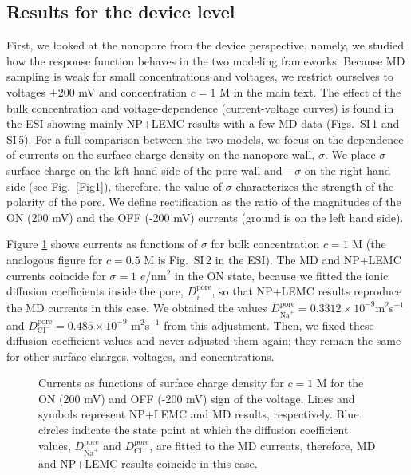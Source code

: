 \documentclass[fleqn,10pt]{SelfArx} %
\begin{document}
\subsection*{Results for the device level}

First, we looked at the nanopore from the device perspective, namely, we studied how the response function behaves in the two modeling frameworks.
Because MD sampling is weak for small concentrations and voltages, we restrict ourselves to voltages $\pm 200$ mV and concentration $c=1$ M in the main text.
The effect of the bulk concentration and voltage-dependence (current-voltage curves) is found in the ESI showing mainly NP+LEMC results with a few MD data (Figs.\ SI\,1 and SI\,5).
For a full comparison between the two models, we focus on the dependence of currents on the surface charge density on the nanopore wall, $\sigma$.
We place $\sigma$ surface charge on the left hand side of the pore wall and $-\sigma$ on the right hand side (see Fig.\ \ref{Fig1}), therefore, the value of $\sigma$ characterizes the strength of the polarity of the pore. 
We define rectification as the ratio of the magnitudes of the  ON (200 mV) and the OFF (-200 mV) currents (ground is on the left hand side).

Figure \ref{Fig2} shows currents as functions of $\sigma$ for bulk concentration $c=1$ M (the analogous figure for $c=0.5$ M is Fig.\ SI\,2 in the ESI).
The MD and NP+LEMC currents coincide for $\sigma=1$ $e$/nm$^{2}$ in the ON state, because we fitted the ionic diffusion coefficients inside the pore, $D_{i}^{\mathrm{pore}}$, so that NP+LEMC results reproduce the MD currents in this case.
We obtained the values $D_{\mathrm{Na}^{+}}^{\mathrm{pore}}=0.3312\times 10^{-9}$m$^{2}$s$^{-1}$ and $D_{\mathrm{Cl}^{-}}^{\mathrm{pore}}=0.485\times 10^{-9}$ m$^{2}$s$^{-1}$ from this adjustment.
Then, we fixed these diffusion coefficient values and never adjusted them again; they remain the same for other surface charges, voltages, and concentrations.


\begin{figure}[t]
 \begin{center}
 \end{center}
\caption{Currents as functions of surface charge density for $c=1$ M for the ON (200 mV) and OFF (-200 mV) sign of the voltage. Lines and symbols represent NP+LEMC and MD results, respectively. Blue circles indicate the state point at which the diffusion coefficient values, $D_{\mathrm{Na}^{+}}^{\mathrm{pore}}$ and $D_{\mathrm{Cl}^{-}}^{\mathrm{pore}}$, are fitted to the MD currents, therefore, MD and NP+LEMC results coincide in this case.}
 \label{Fig2}
\end{figure} 
\end{document}
